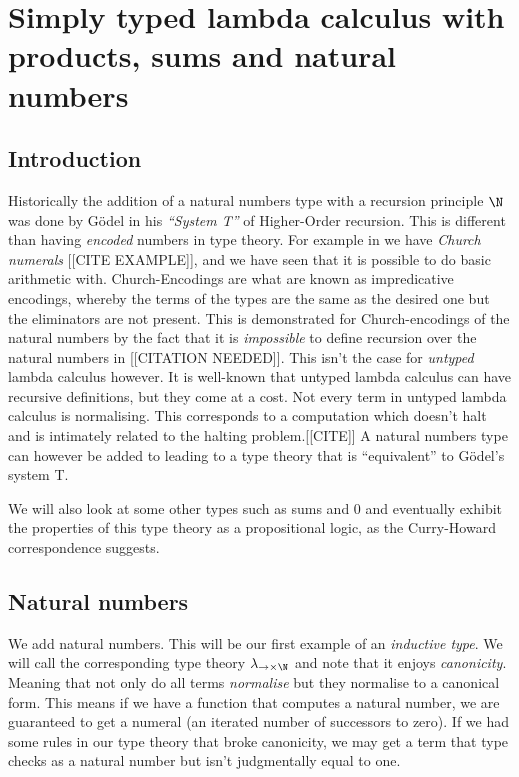 \section{Simply typed lambda calculus with products, sums and natural numbers}

\subsection{Introduction}

Historically the addition of a natural numbers type with a recursion principle $\N$ was done by G\"odel in his \emph{``System T''} of Higher-Order recursion. This is different than having \emph{encoded} numbers in type theory. For example in \stlc we have \emph{Church numerals} [[CITE EXAMPLE]], and we have seen that it is possible to do basic arithmetic with. Church-Encodings are what are known as impredicative encodings, whereby the terms of the types are the same as the desired one but the eliminators are not present. This is demonstrated for Church-encodings of the natural numbers by the fact that it is \emph{impossible} to define recursion over the natural numbers in \stlc \cite{a} [[CITATION NEEDED]]. This isn't the case for \emph{untyped} lambda calculus however. It is well-known that untyped lambda calculus can have recursive definitions, but they come at a cost. Not every term in untyped lambda calculus is normalising. This corresponds to a computation which doesn't halt and is intimately related to the halting problem.[[CITE]] A natural numbers type can however be added to \stlc leading to a type theory that is ``equivalent'' to G\"odel's system T.

We will also look at some other types such as sums and $0$ and eventually exhibit the properties of this type theory as a propositional logic, as the Curry-Howard correspondence suggests.

\subsection{Natural numbers}

We add natural numbers. This will be our first example of an \emph{inductive type}. We will call the corresponding type theory $\lambda_{\to \times \N}$ and note that it enjoys \emph{canonicity}. Meaning that not only do all terms \emph{normalise} but they normalise to a canonical form. This means if we have a function that computes a natural number, we are guaranteed to get a numeral (an iterated number of successors to zero). If we had some rules in our type theory that broke canonicity, we may get a term that type checks as a natural number but isn't judgmentally equal to one.


